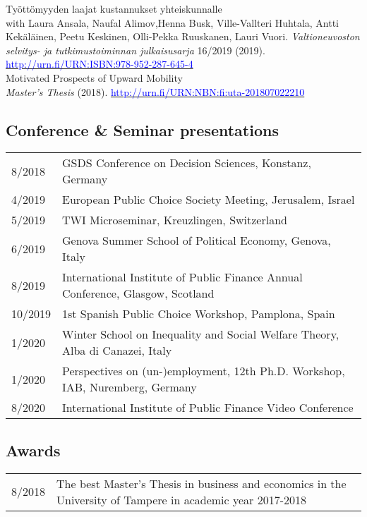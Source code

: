 \documentclass[16pt]{article}
\begin{document}
\noindent Ty\"{o}tt\"{o}myyden laajat kustannukset yhteiskunnalle \\
\noindent with Laura Ansala, Naufal Alimov,Henna Busk, Ville-Vallteri Huhtala, Antti Kek\"{a}l\"{a}inen, Peetu Keskinen, Olli-Pekka Ruuskanen, Lauri Vuori.  \textit{Valtioneuvoston selvitys- ja tutkimustoiminnan julkaisusarja} 16/2019 (2019). \href{http://urn.fi/URN:ISBN:978-952-287-645-4}{\textcolor{blue}{http://urn.fi/URN:ISBN:978-952-287-645-4}} \\

\noindent Motivated Prospects of Upward Mobility \\
\noindent \textit{Master's Thesis} (2018). \href{http://urn.fi/URN:NBN:fi:uta-201807022210}{\textcolor{blue}{http://urn.fi/URN:NBN:fi:uta-201807022210}}



\subsection*{Conference \& Seminar presentations}
\begin{tabular}{@{}p{1.5in}p{5in}}
8/2018             & GSDS Conference on Decision Sciences, Konstanz, Germany\\
4/2019             & European Public Choice Society Meeting, Jerusalem, Israel\\
5/2019             & TWI Microseminar, Kreuzlingen, Switzerland \\
6/2019             & Genova Summer School of Political Economy, Genova, Italy \\
8/2019             & International Institute of Public Finance Annual Conference, Glasgow, Scotland \\
10/2019           & 1st Spanish Public Choice Workshop, Pamplona, Spain \\
1/2020             & Winter School on Inequality and Social Welfare Theory, Alba di Canazei, Italy \\
1/2020             & Perspectives on (un-)employment, 12th Ph.D. Workshop, IAB, Nuremberg, Germany \\
8/2020             & International Institute of Public Finance Video Conference
\end{tabular}

\subsection*{Awards} 
\begin{tabular}{@{}p{1.5in}p{5in}}
8/2018           & The best Master's Thesis in business and economics in the University of Tampere in academic year 2017-2018 \\
\end{tabular}
\end{document}
